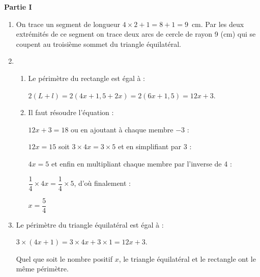 \documentclass[10pt]{article}
\begin{document}
\setlength\parindent{0mm}
\pagestyle{fancy}
\thispagestyle{empty}
    
    
    




\medskip

\textbf{Partie I}

\begin{enumerate}
\item On trace un segment de longueur $4 \times 2 + 1 = 8 + 1 = 9$~cm. Par les deux extrémités de ce segment on trace deux arcs de cercle de rayon 9 (cm) qui se coupent au troisième sommet du triangle équilatéral.
\item
	\begin{enumerate}
		\item Le périmètre du rectangle est égal à :
		
		$2(L + l) = 2(4x + 1,5 + 2x) = 2(6x + 1,5) = 12x + 3$.
		\item Il faut résoudre l'équation :
		
		$12x + 3 = 18$ ou en ajoutant à chaque membre $- 3$ :
		
		$12x = 15$ soit $3 \times 4x = 3 \times 5$ et en simplifiant par 3 :
		
		$4x = 5$ et enfin en multipliant chaque membre par l'inverse de 4 :
		
		$\dfrac{1}{4} \times 4x = \dfrac{1}{4} \times 5$, d'où finalement :
		
		$x = \dfrac{5}{4}$
	\end{enumerate}
\item Le périmètre du triangle équilatéral est égal à : 

$3 \times (4x + 1) = 3 \times 4x + 3 \times 1 = 12x + 3$.

Quel que soit le nombre positif $x$, le triangle équilatéral et le rectangle ont le même périmètre.
\end{enumerate}
\end{document}
